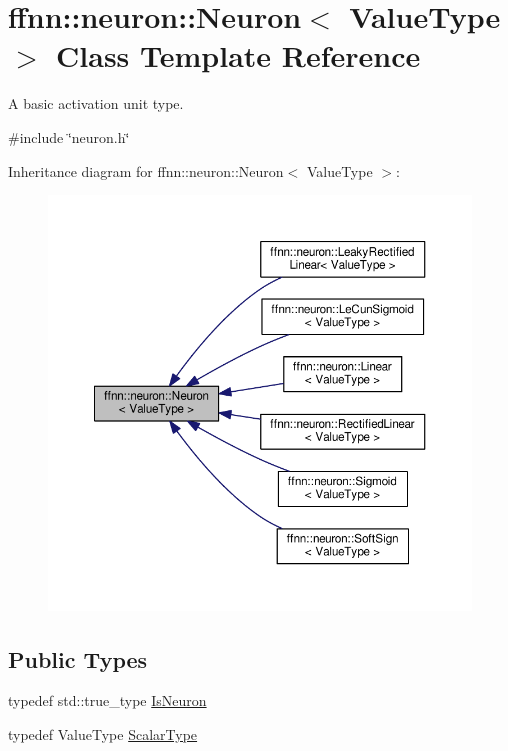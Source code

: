 \hypertarget{classffnn_1_1neuron_1_1_neuron}{\section{ffnn\-:\-:neuron\-:\-:Neuron$<$ Value\-Type $>$ Class Template Reference}
\label{classffnn_1_1neuron_1_1_neuron}
}


A basic activation unit type.  




{\ttfamily \#include \char`\"{}neuron.\-h\char`\"{}}



Inheritance diagram for ffnn\-:\-:neuron\-:\-:Neuron$<$ Value\-Type $>$\-:\nopagebreak
\begin{figure}[H]
\begin{center}
\leavevmode
\includegraphics[width=350pt]{classffnn_1_1neuron_1_1_neuron__inherit__graph}
\end{center}
\end{figure}
\subsection*{Public Types}
\begin{DoxyCompactItemize}
\item 
typedef std\-::true\-\_\-type \hyperlink{classffnn_1_1neuron_1_1_neuron_a75bfde562dcb9d0e606f52ca73451de8}{Is\-Neuron}
\item 
typedef Value\-Type \hyperlink{classffnn_1_1neuron_1_1_neuron_a7813fbdc61bac73d1d5dfac46ea178f3}{Scalar\-Type}
\end{DoxyCompactItemize}
